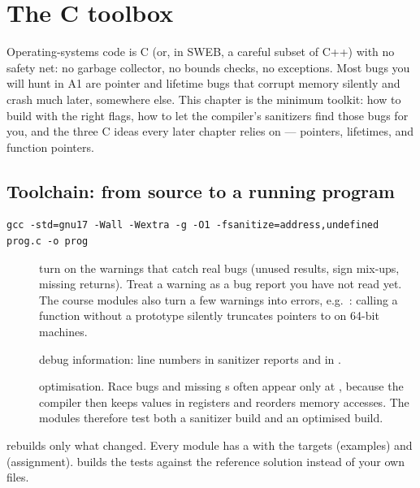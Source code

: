 \chapter{The C toolbox}
\label{ch:c}

Operating-systems code is C (or, in SWEB, a careful subset of C++) with no
safety net: no garbage collector, no bounds checks, no exceptions. Most
bugs you will hunt in A1 are pointer and lifetime bugs that corrupt memory
silently and crash much later, somewhere else. This chapter is the minimum
toolkit: how to build with the right flags, how to let the compiler's
sanitizers find those bugs for you, and the three C ideas every later
chapter relies on --- pointers, lifetimes, and function pointers.

\section{Toolchain: from source to a running program}

\begin{lstlisting}[style=shell]
gcc -std=gnu17 -Wall -Wextra -g -O1 -fsanitize=address,undefined prog.c -o prog
\end{lstlisting}

\begin{description}
  \item[] turn on the warnings that catch real bugs
    (unused results, sign mix-ups, missing returns). Treat a warning as a
    bug report you have not read yet. The course modules also turn a few
    warnings into errors, e.g.\ :
    calling a function without a prototype silently truncates pointers to
     on 64-bit machines.
  \item[] debug information: line numbers in sanitizer reports
    and in .
  \item[] optimisation. Race bugs and missing
    s often appear only at , because the compiler
    then keeps values in registers and reorders memory accesses. The
    modules therefore test both a sanitizer build and an optimised build.
\end{description}

 rebuilds only what changed. Every module has a
 with the targets  (examples) and 
(assignment).  builds the tests
against the reference solution instead of your own files.

